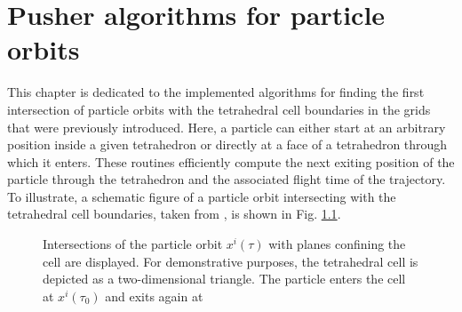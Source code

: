 \documentclass[./main.tex]{subfiles}
\begin{document}
\chapter{Pusher algorithms for particle orbits}
\vspace{-0.5cm}

This chapter is dedicated to the implemented algorithms for finding the first intersection of particle orbits with the tetrahedral cell boundaries in the grids that were previously introduced. Here, a particle can either start at an arbitrary position inside a given tetrahedron or directly at a face of a tetrahedron through which it enters. These routines efficiently compute the next exiting position of the particle through the tetrahedron and the associated flight time of the trajectory.
To illustrate, a schematic figure of a particle orbit intersecting with the tetrahedral cell boundaries, taken from \cite{Eder_DA}, is shown in Fig. \ref{fig:triangle01}.
\begin{figure}[h]
	\captionsetup{justification = raggedright,singlelinecheck = false}  
	 \caption{Intersections of the particle orbit $x^i(\tau)$ with planes confining the cell are displayed. For demonstrative purposes, the tetrahedral cell is depicted as a two-dimensional triangle. The particle enters the cell at $x^i(\tau_0)$ and exits again at 
}
	\label{fig:triangle01}
\end{figure}
\end{document}
